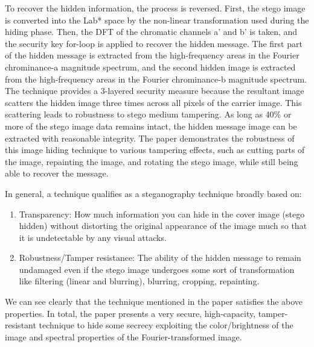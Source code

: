 To recover the hidden information, the process is reversed. First, the stego image is converted into the Lab* space by the non-linear transformation used during the hiding phase. Then, the DFT of the chromatic channels a' and b' is taken, and the security key for-loop is applied to recover the hidden message. The first part of the hidden message is extracted from the high-frequency areas in the Fourier chrominance-a magnitude spectrum, and the second hidden image is extracted from the high-frequency areas in the Fourier chrominance-b magnitude spectrum. The technique provides a 3-layered security measure because the resultant image scatters the hidden image three times across all pixels of the carrier image. This scattering leads to robustness to stego medium tampering. As long as 40\% or more of the stego image data remains intact, the hidden message image can be extracted with reasonable integrity. The paper demonstrates the robustness of this image hiding technique to various tampering effects, such as cutting parts of the image, repainting the image, and rotating the stego image, while still being able to recover the message.

In general, a technique qualifies as a steganography technique broadly based on:
\begin{enumerate}
  \item Transparency: How much information you can hide in the cover image (stego hidden) without distorting the original appearance of the image much so that it is undetectable by any visual attacks.
  \item Robustness/Tamper resistance: The ability of the hidden message to remain undamaged even if the stego image undergoes some sort of transformation like filtering (linear and blurring), blurring, cropping, repainting.
\end{enumerate}
We can see clearly that the technique mentioned in the paper satisfies the above properties. In total, the paper presents a very secure, high-capacity, tamper-resistant technique to hide some secrecy exploiting the color/brightness of the image and spectral properties of the Fourier-transformed image.
